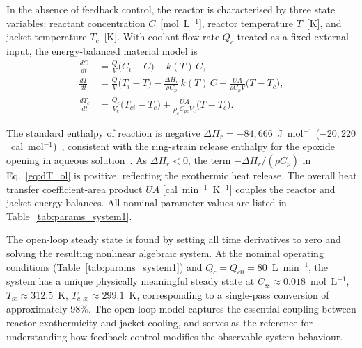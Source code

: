 \documentclass[aps,pre,twocolumn,superscriptaddress]{revtex4-2}
\begin{document}
In the absence of feedback control, the reactor is characterised by
three state variables: reactant concentration $C$~[mol~L$^{-1}$],
reactor temperature $T$~[K], and jacket temperature $T_c$~[K].  With
coolant flow rate $Q_c$ treated as a fixed external input, the
energy-balanced material model is
%
\begin{subequations}
\label{eq:open_loop}
\begin{align}
  \frac{dC}{dt}
    &= \frac{Q}{V}\bigl(C_i - C\bigr)
       - k(T)\,C,
  \label{eq:dC_ol} \\[4pt]
  \frac{dT}{dt}
    &= \frac{Q}{V}\bigl(T_i - T\bigr)
       - \frac{\Delta H_r}{\rho C_p}\,k(T)\,C
       - \frac{U\!A}{\rho C_p V}\bigl(T - T_c\bigr),
  \label{eq:dT_ol} \\[4pt]
  \frac{dT_c}{dt}
    &= \frac{Q_c}{V_c}\bigl(T_{ci} - T_c\bigr)
       + \frac{U\!A}{\rho_c C_{pc} V_c}\bigl(T - T_c\bigr).
  \label{eq:dTc_ol}
\end{align}
\end{subequations}
%

The standard enthalpy of reaction is negative $\Delta H_r = -84{,}666$~J~mol$^{-1}$ ($-20{,}220$~cal~mol$^{-1}$)~\citep{Fogler2016,Ziyai2022},
consistent with the ring-strain release enthalpy for the epoxide opening in aqueous solution~\citep{NIST_WebBook}. As $\Delta H_r < 0$, the term $-\Delta H_r / (\rho C_p)$ in Eq.~\eqref{eq:dT_ol} is positive, reflecting the exothermic heat release. The overall heat transfer coefficient-area product $U\!A$ [cal~min$^{-1}$~K$^{-1}$] couples the reactor and jacket energy balances. All nominal parameter values are listed in Table~\ref{tab:params_system1}.

The open-loop steady state is found by setting all time derivatives to zero and solving the resulting nonlinear algebraic system.  At the
nominal operating conditions (Table~\ref{tab:params_system1}) and $Q_c = Q_{c0} = 80$~L~min$^{-1}$, the system has a unique physically
meaningful steady state at
$C_\mathrm{ss} \approx 0.018$~mol~L$^{-1}$,
$T_\mathrm{ss} \approx 312.5$~K,
$T_{c,\mathrm{ss}} \approx 299.1$~K,
corresponding to a single-pass conversion of approximately 98\%. The open-loop model captures the essential coupling between reactor exothermicity and jacket cooling, and serves as the reference for understanding how feedback control modifies the observable system behaviour.
\end{document}
